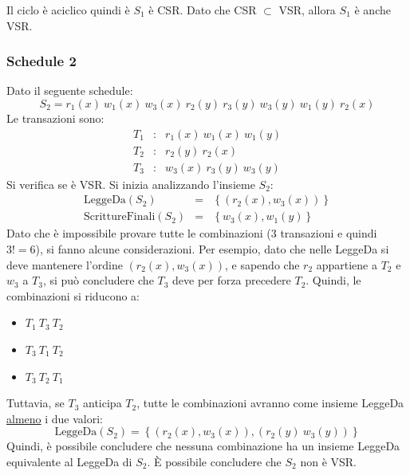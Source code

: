 \documentclass[a4paper]{article}
\begin{document}
	\noindent
	Il ciclo è aciclico quindi è $S_{1}$ è CSR. Dato che CSR $\subset$ VSR, allora $S_{1}$ è anche VSR.\newpage
	
	\subsubsection{Schedule 2}
	
	Dato il seguente schedule:
	\begin{equation*}
		S_{2} = r_{1}\left(x\right) \: w_{1}\left(x\right) \: w_{3}\left(x\right) \: r_{2}\left(y\right) \: r_{3}\left(y\right) \: w_{3}\left(y\right) \: w_{1}\left(y\right) \: r_{2}\left(x\right)
	\end{equation*}
	Le transazioni sono:
	\begin{equation*}
		\begin{array}{lll}
			T_{1} &:& r_{1}\left(x\right) \: w_{1}\left(x\right) \: w_{1}\left(y\right) \\
			T_{2} &:& r_{2}\left(y\right) \: r_{2}\left(x\right) \\
			T_{3} &:& w_{3}\left(x\right) \: r_{3}\left(y\right) \: w_{3}\left(y\right)
		\end{array}
	\end{equation*}
	Si verifica se è VSR. Si inizia analizzando l'insieme $S_{2}$:
	\begin{equation*}
		\begin{array}{lll}
			\text{LeggeDa}\left(S_{2}\right) 			&=& \left\{\left(r_{2}\left(x\right), w_{3}\left(x\right)\right)\right\} \\
			\text{ScrittureFinali}\left(S_{2}\right) 	&=& \left\{w_{3}\left(x\right), w_{1}\left(y\right)\right\}
		\end{array}
	\end{equation*}
	Dato che è impossibile provare tutte le combinazioni (3 transazioni e quindi $3! = 6$), si fanno alcune considerazioni. Per esempio, dato che nelle LeggeDa si deve mantenere l'ordine $\left(r_{2}\left(x\right), w_{3}\left(x\right)\right)$, e sapendo che $r_{2}$ appartiene a $T_{2}$ e $w_{3}$ a $T_{3}$, si può concludere che $T_{3}$ deve per forza precedere $T_{2}$. Quindi, le combinazioni si riducono a:
	\begin{itemize}
		\item $T_{1} \: T_{3} \: T_{2}$
		
		\item $T_{3} \: T_{1} \: T_{2}$
		
		\item $T_{3} \: T_{2} \: T_{1}$
	\end{itemize}
	Tuttavia, se $T_{3}$ anticipa $T_{2}$, tutte le combinazioni avranno come insieme LeggeDa \underline{almeno} i due valori:
	\begin{equation*}
		\text{LeggeDa}\left(S_{2}\right) = \left\{\left(r_{2}\left(x\right), w_{3}\left(x\right)\right), \left(r_{2}\left(y\right) \: w_{3}\left(y\right)\right)\right\}
	\end{equation*}
	Quindi, è possibile concludere che nessuna combinazione ha un insieme LeggeDa equivalente al LeggeDa di $S_{2}$. È possibile concludere che $S_{2}$ non è VSR.\newpage
	
\end{document}
